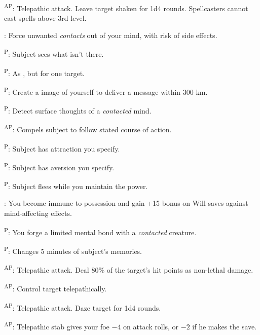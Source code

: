 \begin{enumerate*}
      \textsuperscript{AP}: Telepathic attack. Leave target shaken for 1d4 rounds. Spellcasters cannot cast spells above 3rd level.

      : Force unwanted \emph{contacts} out of your mind, with risk of side effects.

      \textsuperscript{P}: Subject sees what isn't there.

      \textsuperscript{P}: As , but for one target.

      \textsuperscript{P}: Create a image of yourself to deliver a message within 300 km.

      \textsuperscript{P}: Detect surface thoughts of a \emph{contacted} mind.

      \textsuperscript{AP}: Compels subject to follow stated course of action.

\item {}\textsuperscript{P}: Subject has attraction you specify.

      \textsuperscript{P}: Subject has aversion you specify.

      \textsuperscript{P}: Subject flees while you maintain the power.

      : You become immune to possession and gain +15 bonus on Will saves against mind-affecting effects.

      \textsuperscript{P}: You forge a limited mental bond with a \emph{contacted} creature.

      \textsuperscript{P}: Changes 5 minutes of subject's memories.

      \textsuperscript{AP}: Telepathic attack. Deal 80\% of the target's hit points as non-lethal damage.

\item {}\textsuperscript{AP}: Control target telepathically.

      \textsuperscript{AP}: Telepathic attack. Daze target for 1d4 rounds.

      \textsuperscript{AP}: Telepathic stab gives your foe $-4$ on attack rolls, or $-2$ if he makes the save.


\end{enumerate*}
